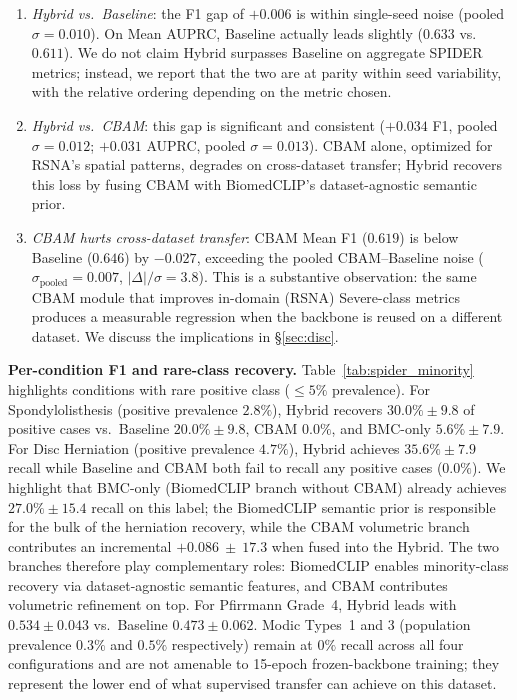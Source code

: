 \documentclass[conference]{IEEEtran}
\begin{document}
\begin{enumerate}[leftmargin=*,topsep=0pt]
\item \emph{Hybrid vs.\ Baseline}: the F1 gap of $+0.006$ is within
single-seed noise (pooled $\sigma = 0.010$). On Mean AUPRC, Baseline
actually leads slightly ($0.633$ vs.\ $0.611$). We do not claim
Hybrid surpasses Baseline on aggregate SPIDER metrics; instead, we
report that the two are at parity within seed variability, with the
relative ordering depending on the metric chosen.

\item \emph{Hybrid vs.\ CBAM}: this gap is significant and consistent
($+0.034$ F1, pooled $\sigma = 0.012$; $+0.031$ AUPRC, pooled
$\sigma = 0.013$). CBAM alone, optimized for RSNA's spatial patterns,
degrades on cross-dataset transfer; Hybrid recovers this loss by
fusing CBAM with BiomedCLIP's dataset-agnostic semantic prior.

\item \emph{CBAM hurts cross-dataset transfer}: CBAM Mean F1
($0.619$) is below Baseline ($0.646$) by $-0.027$, exceeding the
pooled CBAM--Baseline noise ($\sigma_{\text{pooled}} = 0.007$,
$|\Delta|/\sigma = 3.8$). This is a substantive
observation: the same CBAM module that improves in-domain (RSNA)
Severe-class metrics produces a measurable regression when the
backbone is reused on a different dataset. We discuss the implications
in \S\ref{sec:disc}.
\end{enumerate}

\textbf{Per-condition F1 and rare-class recovery.}
Table~\ref{tab:spider_minority} highlights conditions with rare
positive class ($\leq 5\%$ prevalence). For Spondylolisthesis
(positive prevalence $2.8\%$), Hybrid recovers $30.0\% \pm 9.8$ of
positive cases vs.\ Baseline $20.0\% \pm 9.8$, CBAM $0.0\%$, and
BMC-only $5.6\% \pm 7.9$. For Disc Herniation (positive prevalence
$4.7\%$), Hybrid achieves $35.6\% \pm 7.9$ recall while Baseline and
CBAM both fail to recall any positive cases ($0.0\%$). We highlight
that BMC-only (BiomedCLIP branch without CBAM) already achieves
$27.0\% \pm 15.4$ recall on this label; the BiomedCLIP semantic
prior is responsible for the bulk of the herniation recovery, while
the CBAM volumetric branch contributes an incremental
$+0.086~\pm~17.3$ when fused into the Hybrid. The two branches
therefore play complementary roles: BiomedCLIP enables minority-class
recovery via dataset-agnostic semantic features, and CBAM contributes
volumetric refinement on top. For Pfirrmann
Grade~4, Hybrid leads with $0.534 \pm 0.043$ vs.\ Baseline
$0.473 \pm 0.062$. Modic Types~1 and 3 (population prevalence $0.3\%$
and $0.5\%$ respectively) remain at $0\%$ recall across all four
configurations and are not amenable to 15-epoch frozen-backbone
training; they represent the lower end of what supervised transfer
can achieve on this dataset.
\end{document}
